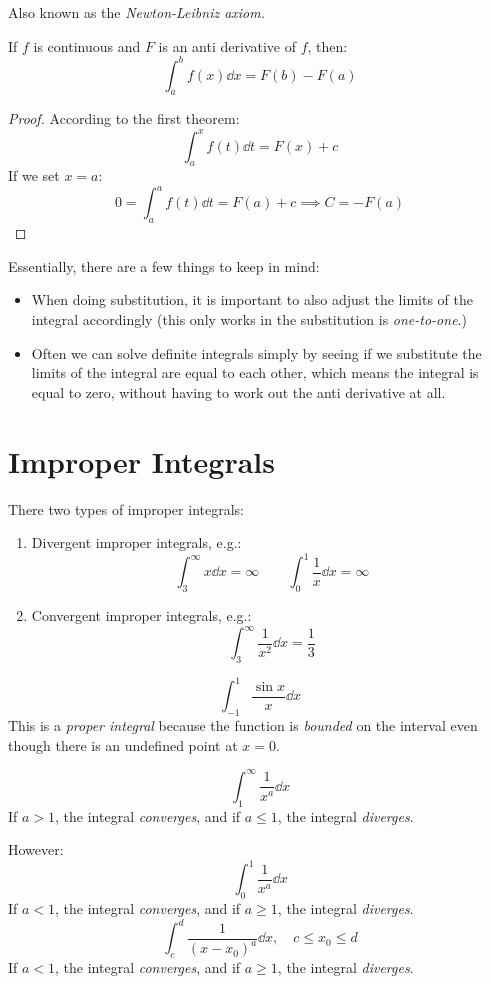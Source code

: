 \documentclass[00_complete]{subfiles}
\begin{document}
\begin{definition}
    Also known as the \emph{Newton-Leibniz axiom.}

    If $f$ is continuous and $F$ is an anti derivative of $f$, then:
    $$\int_{a}^{b}f(x)\dd{x}=F(b)-F(a)$$
    \begin{proof}
        According to the first theorem:
        $$\int_{a}^{x}f(t)\dd{t}=F(x)+c$$
        If we set $x=a$:
        $$0=\int_{a}^{a}f(t)\dd{t}=F(a)+c \implies C = -F(a)$$
    \end{proof}
\end{definition}
Essentially, there are a few things to keep in mind:
\begin{itemize}
    \item When doing substitution, it is important to also adjust the limits of
        the integral accordingly (this only works in the substitution is
        \emph{one-to-one}.)
    \item Often we can solve definite integrals simply by seeing if we
        substitute the limits of the integral are equal to each other, which
        means the integral is equal to zero, without having to work out the
        anti derivative at all.
\end{itemize}
\section{Improper Integrals}
There two types of improper integrals:
\begin{enumerate}
    \item Divergent improper integrals, e.g.:
        $$\int_{3}^{\infty}x\dd{x}=\infty \qquad
        \int_{0}^{1}\frac{1}{x}\dd{x}=\infty$$
    \item Convergent improper integrals, e.g.:
        $$\int_{3}^{\infty}\frac{1}{x^2}\dd{x}=\frac{1}{3}$$
\end{enumerate}
\begin{note}
    $$\int_{-1}^{1}\frac{\sin x}{x}\dd{x}$$
    This is a \emph{proper integral} because the function is \emph{bounded} on
    the interval even though there is an undefined point at $x=0$.
\end{note}
\begin{theorem}
$$\int_{1}^{\infty}\frac{1}{x^a}\dd{x}$$
If $a>1$, the integral \emph{converges}, and if $a\leq 1$, the integral
\emph{diverges}.

However:
$$\int_{0}^{1}\frac{1}{x^a}\dd{x}$$
If $a<1$, the integral \emph{converges}, and if $a\geq 1$, the integral
\emph{diverges}.
$$\int_{c}^{d}\frac{1}{(x-x_0)^a}\dd{x}, \quad c \leq x_0\leq d$$
If $a<1$, the integral \emph{converges}, and if $a\geq 1$, the integral
\emph{diverges}.
\end{theorem}
\end{document}
